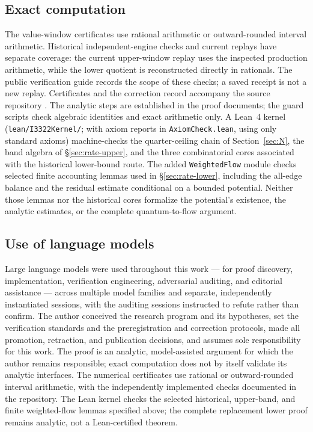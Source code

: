 \documentclass[11pt]{article}
\theoremstyle{remark}
\begin{document}
\subsection*{Exact computation}
The value-window certificates use rational arithmetic or outward-rounded
interval arithmetic. Historical independent-engine checks and current
replays have separate coverage: the current upper-window replay uses
the inspected production arithmetic, while the lower quotient is
reconstructed directly in rationals. The public verification guide records
the scope of these checks; a saved receipt is not a new replay.
Certificates and the correction record accompany the source repository
\cite{Repo}. The analytic steps are established in the proof documents; the guard
scripts check algebraic identities and exact arithmetic only. A Lean~4
kernel \cite{Lean} (\texttt{lean/I3322Kernel/}; with axiom reports in
\texttt{AxiomCheck.lean}, using only standard axioms) machine-checks
the quarter-ceiling chain of
Section~\ref{sec:N}, the band algebra of \S\ref{sec:rate-upper}, and the
three combinatorial cores associated with the historical lower-bound
route. The added \texttt{WeightedFlow} module checks selected finite
accounting lemmas used in \S\ref{sec:rate-lower}, including the all-edge
balance and the residual estimate conditional on a bounded potential.
Neither those lemmas nor the historical cores formalize the potential's
existence, the analytic estimates, or the complete quantum-to-flow argument.

\subsection*{Use of language models}
Large language models were used throughout this work --- for proof
discovery, implementation, verification engineering, adversarial auditing,
and editorial assistance --- across multiple model families and separate,
independently instantiated sessions, with the auditing sessions instructed to
refute rather than confirm. The author conceived the research program and its
hypotheses, set the verification standards and the preregistration and
correction protocols, made all promotion, retraction, and publication
decisions, and assumes sole responsibility for this work. The
proof is an analytic, model-assisted argument for which the author remains
responsible; exact computation does not by itself validate its analytic
interfaces. The numerical certificates use rational or outward-rounded
interval arithmetic, with the independently implemented checks documented
in the repository. The Lean kernel checks the selected
historical, upper-band, and finite weighted-flow lemmas specified above;
the complete replacement lower proof remains analytic, not a
Lean-certified theorem.
\end{document}
